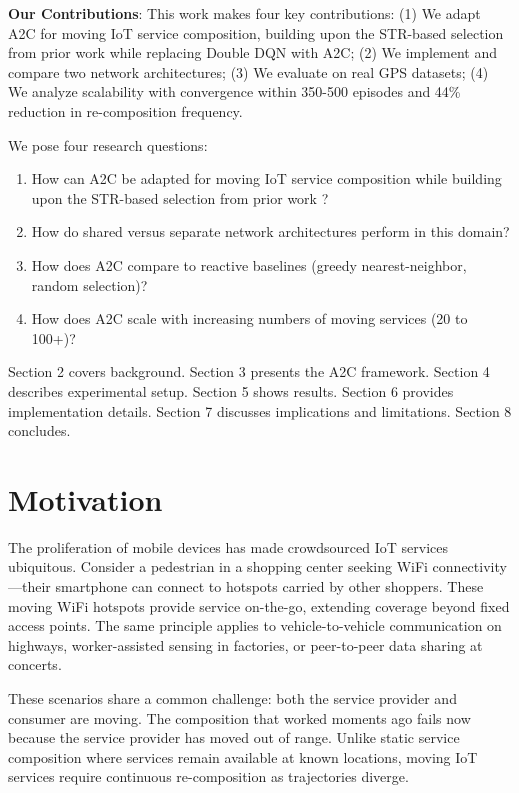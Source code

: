\documentclass[10pt,twocolumn]{article}
\begin{document}
\textbf{Our Contributions}: This work makes four key contributions: (1) We adapt A2C for moving IoT service composition, building upon the STR-based selection from prior work \cite{neiat2021} while replacing Double DQN with A2C; (2) We implement and compare two network architectures; (3) We evaluate on real GPS datasets; (4) We analyze scalability with convergence within 350-500 episodes and 44\% reduction in re-composition frequency.

We pose four research questions:

\begin{enumerate}
	\item How can A2C be adapted for moving IoT service composition while
	      building upon the STR-based selection from prior work \cite{neiat2021}?
	\item How do shared versus separate network architectures perform in this
	      domain?
	\item How does A2C compare to reactive baselines (greedy nearest-neighbor,
	      random selection)?
	\item How does A2C scale with increasing numbers of moving services (20 to
	      100+)?
\end{enumerate}

Section 2 covers background. Section 3 presents the A2C framework.
Section 4 describes experimental setup. Section 5 shows results. Section
6 provides implementation details. Section 7 discusses implications and
limitations. Section 8 concludes.

\section{Motivation}\label{motivation}

The proliferation of mobile devices has made crowdsourced IoT services
ubiquitous. Consider a pedestrian in a shopping center seeking WiFi
connectivity---their smartphone can connect to hotspots carried by other
shoppers. These moving WiFi hotspots provide service on-the-go,
extending coverage beyond fixed access points. The same principle
applies to vehicle-to-vehicle communication on highways, worker-assisted
sensing in factories, or peer-to-peer data sharing at concerts.

These scenarios share a common challenge: both the service provider and
consumer are moving. The composition that worked moments ago fails now
because the service provider has moved out of range. Unlike static
service composition where services remain available at known locations,
moving IoT services require continuous re-composition as trajectories
diverge.
\end{document}
